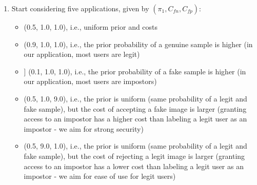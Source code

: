 \documentclass[a4paper, 12pt, english]{article}
\begin{document}
    \begin{enumerate}
        \item Start considering five applications, given by \((\pi_1,C_{fn},C_{fp})\):
        \begin{itemize}

            \item (0.5, 1.0, 1.0), i.e., uniform prior and costs
            \item (0.9, 1.0, 1.0), i.e., the prior probability of a genuine sample is higher (in our application, most users are legit)
            \item] (0.1, 1.0, 1.0), i.e., the prior probability of a fake sample is higher (in our application, most users are impostors)
            \item (0.5, 1.0, 9.0), i.e., the prior is uniform (same probability of a legit and fake sample), but the cost of accepting a fake image is larger (granting access to an impostor has a higher cost than labeling a legit user as an impostor - we aim for strong security)
            \item (0.5, 9.0, 1.0), i.e., the prior is uniform (same probability of a legit and fake sample), but the cost of rejecting a legit image is larger (granting access to an impostor has a lower cost than labeling a legit user as an impostor - we aim for ease of use for legit users)


\end{itemize}
\end{enumerate}
\end{document}
